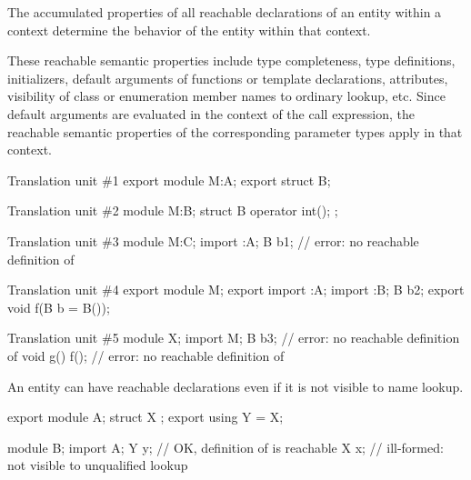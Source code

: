 \pnum
The accumulated properties of all reachable declarations of
an entity within a context
determine the behavior of the entity within that context.
\begin{note}
These reachable semantic properties include type completeness,
type definitions, initializers,
default arguments of functions or template declarations, attributes,
visibility of class or enumeration member names to ordinary lookup,
etc.
Since default arguments are evaluated in the context of the call expression,
the reachable semantic properties of the corresponding parameter types apply in
that context.
\begin{example}
\begin{codeblocktu}{Translation unit \#1}
export module M:A;
export struct B;
\end{codeblocktu}

\begin{codeblocktu}{Translation unit \#2}
module M:B;
struct B {
  operator int();
};
\end{codeblocktu}

\begin{codeblocktu}{Translation unit \#3}
module M:C;
import :A;
B b1;                           // error: no reachable definition of 
\end{codeblocktu}

\begin{codeblocktu}{Translation unit \#4}
export module M;
export import :A;
import :B;
B b2;
export void f(B b = B());
\end{codeblocktu}

\begin{codeblocktu}{Translation unit \#5}
module X;
import M;
B b3;                           // error: no reachable definition of 
void g() { f(); }               // error: no reachable definition of 
\end{codeblocktu}
\end{example}
\end{note}

\pnum
\begin{note}
An entity can have reachable declarations
even if it is not visible to name lookup.
\end{note}
\begin{example}
\begin{codeblock}
export module A;
struct X {};
export using Y = X;

module B;
import A;
Y y;                // OK, definition of  is reachable
X x;                // ill-formed:  not visible to unqualified lookup
\end{codeblock}
\end{example}
